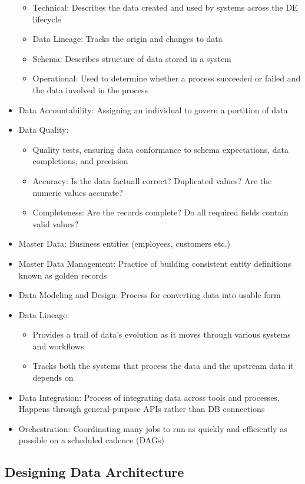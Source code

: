 \documentclass[11pt]{scrartcl}
\begin{document}
\begin{itemize}
\begin{itemize}
		\item Technical: Describes the data created and used by systems across the DE lifecycle
		\item Data Lineage: Tracks the origin and changes to data
		\item Schema: Describes structure of data stored in a system
		\item Operational: Used to determine whether a process succeeded or failed and the data involved in the process
	\end{itemize}
	\item Data Accountability: Assigning an individual to govern a portition of data
	\item Data Quality: 
	\begin{itemize}
		\item Quality tests, ensuring data conformance to schema expectations, data completions, and precision
		\item Accuracy: Is the data factuall correct? Duplicated values? Are the numeric values accurate?
		\item Completeness: Are the records complete? Do all required fields contain valid values? 
	\end{itemize}
	\item Master Data: Business entities (employees, customers etc.)
	\item Master Data Management: Practice of building consistent entity definitions known as golden records
	\item Data Modeling and Design: Process for converting data into usable form
	\item Data Lineage:
	\begin{itemize}
		\item Provides a trail of data's evolution as it moves through various systems and workflows
		\item Tracks both the systems that process the data and the upstream data it depends on
	\end{itemize}
	\item Data Integration: Process of integrating data across tools and processes. Happens through general-purpose APIs rather than DB connections
	\item Orchestration: Coordinating many jobs to run as quickly and efficiently as possible on a scheduled cadence (DAGs)
\end{itemize}

\subsection*{Designing Data Architecture}
\end{document}
